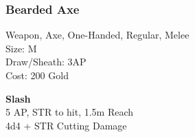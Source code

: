 \subsubsection{Bearded Axe}\label{weapon:beardedAxe}
Weapon, Axe, One-Handed, Regular, Melee\\
Size: M\\
Draw/Sheath: 3AP\\
Cost: 200 Gold

\textbf{Slash}\\
5 AP, STR to hit, 1.5m Reach\\
4d4 + \texttimes STR Cutting Damage
